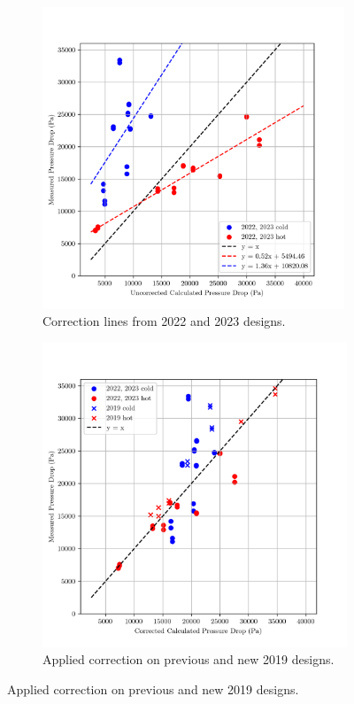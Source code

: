 \documentclass{article}
\begin{document}
\begin{figure}[H]
  \centering
  \begin{subfigure}{.49\textwidth}
    \centering
    \includegraphics[width=0.99\textwidth]{dp_ucalc_vs_meas.png}
    \caption{Correction lines from 2022 and 2023 designs.}
    \label{fig:uncorrected_pressure_drops}
  \end{subfigure}
  \begin{subfigure}{.49\textwidth}
    \centering
    \includegraphics[width=.99\linewidth]{dp_ccalc_vs_meas.png}
    \caption{Applied correction on previous and new 2019 designs.}
    \label{fig:corrected_pressure_drops}
  \end{subfigure}
    

\end{figure}
\end{document}
